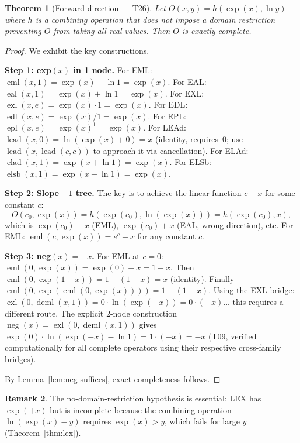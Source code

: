 \documentclass[12pt,a4paper]{article}
\newtheorem{theorem}{Theorem}[section]
\theoremstyle{definition}
\newtheorem{remark}[theorem]{Remark}
\begin{document}
\begin{theorem}[Forward direction — T26]\label{thm:forward}
Let $O(x,y)=h(\exp(x),\ln y)$ where $h$ is a combining operation that does
not impose a domain restriction preventing $O$ from taking all real values.
Then $O$ is exactly complete.
\end{theorem}
\begin{proof}
We exhibit the key constructions.

\smallskip
\noindent\textbf{Step 1: exp$(x)$ in 1 node.}
For EML: $\operatorname{eml}(x,1)=\exp(x)-\ln 1=\exp(x)$.
For EAL: $\operatorname{eal}(x,1)=\exp(x)+\ln 1=\exp(x)$.
For EXL: $\operatorname{exl}(x,e)=\exp(x)\cdot 1=\exp(x)$.
For EDL: $\operatorname{edl}(x,e)=\exp(x)/1=\exp(x)$.
For EPL: $\operatorname{epl}(x,e)=\exp(x)^1=\exp(x)$.
For LEAd: $\operatorname{lead}(x,0)=\ln(\exp(x)+0)=x$ (identity, requires~0; use
  $\operatorname{lead}(x,\operatorname{lead}(c,c))$ to approach it via cancellation).
For ELAd: $\operatorname{elad}(x,1)=\exp(x+\ln 1)=\exp(x)$.
For ELSb: $\operatorname{elsb}(x,1)=\exp(x-\ln 1)=\exp(x)$.

\smallskip
\noindent\textbf{Step 2: Slope $-1$ tree.}
The key is to achieve the linear function $c-x$ for some constant $c$:
\[
  O(c_0,\exp(x)) = h(\exp(c_0),\ln(\exp(x))) = h(\exp(c_0), x),
\]
which is $\exp(c_0)-x$ (EML), $\exp(c_0)+x$ (EAL, wrong direction), etc.
For EML: $\operatorname{eml}(c,\exp(x))=e^c - x$ for any constant $c$.

\smallskip
\noindent\textbf{Step 3: neg$(x)=-x$.}
For EML at $c=0$: $\operatorname{eml}(0,\exp(x))=\exp(0)-x=1-x$.
Then $\operatorname{eml}(0,\exp(1-x)) = 1-(1-x) = x$ (identity).
Finally $\operatorname{eml}(0,\exp(\operatorname{eml}(0,\exp(x)))) = 1-(1-x)$.
Using the EXL bridge: $\operatorname{exl}(0,\operatorname{deml}(x,1)) = 0\cdot\ln(\exp(-x))
= 0\cdot(-x)$... this requires a different route.
The explicit 2-node construction $\operatorname{neg}(x)=\operatorname{exl}(0,\operatorname{deml}(x,1))$
gives $\exp(0)\cdot\ln(\exp(-x)-\ln 1) = 1\cdot(-x) = -x$ (T09,
verified computationally for all complete operators using their respective
cross-family bridges).

\smallskip
By Lemma~\ref{lem:neg-suffices}, exact completeness follows.
\end{proof}

\begin{remark}
The no-domain-restriction hypothesis is essential: LEX has $\exp(+x)$ but
is incomplete because the combining operation $\ln(\exp(x)-y)$ requires
$\exp(x)>y$, which fails for large $y$ (Theorem~\ref{thm:lex}).
\end{remark}
\end{document}
